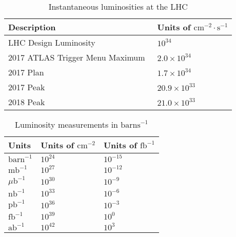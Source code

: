\begin{table}[htpb]
 \centering
 \caption{Instantaneous luminosities at the LHC}
 \begin{tabular}{@{}ll@{}} \toprule
  Description                                                    & Units of $\textrm{cm}^{-2}\cdot\textrm{s}^{-1}$ \\ \midrule
  LHC Design Luminosity~\cite{Bruning:782076}                    & $10^{34}$                                       \\
  2017 ATLAS Trigger Menu Maximum~\cite{TWiki:MenuEvolution2017} & $2.0 \times 10^{34}$                            \\
  2017 Plan~\cite{Indico:MenuCoordination_2017Lumi}              & $1.7 \times 10^{34}$                            \\
  2017 Peak~\cite{TWiki:2017ATLASPeakLumi}                       & $20.9 \times 10^{33}$                           \\
  2018 Peak~\cite{TWiki:2018ATLASPeakLumi}                       & $21.0 \times 10^{33}$                           \\
  \bottomrule
 \end{tabular}\label{table:LHC_Luminosity_Goals}%
\end{table}

\begin{table}[htpb]
 \centering
 \caption{Luminosity measurements in $\text{barns}^{-1}$}
 \begin{tabular}{@{}lll@{}} \toprule
  Units                & Units of $\textrm{cm}^{-2}$ & Units of $\textrm{fb}^{-1}$ \\ \midrule
  $\textrm{barn}^{-1}$ & $10^{24}$                   & $10^{-15}$                  \\
  $\textrm{mb}^{-1}$   & $10^{27}$                   & $10^{-12}$                  \\
  $\mu\textrm{b}^{-1}$ & $10^{30}$                   & $10^{-9}$                   \\
  $\textrm{nb}^{-1}$   & $10^{33}$                   & $10^{-6}$                   \\
  $\textrm{pb}^{-1}$   & $10^{36}$                   & $10^{-3}$                   \\
  $\textrm{fb}^{-1}$   & $10^{39}$                   & $10^{0}$                    \\
  $\textrm{ab}^{-1}$   & $10^{42}$                   & $10^{3}$                    \\
  \bottomrule
 \end{tabular}\label{table:Luminosity}%
\end{table}

